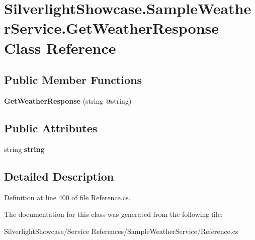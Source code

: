 \hypertarget{class_silverlight_showcase_1_1_sample_weather_service_1_1_get_weather_response}{
\section{SilverlightShowcase.SampleWeatherService.GetWeatherResponse Class Reference}
\label{class_silverlight_showcase_1_1_sample_weather_service_1_1_get_weather_response}
}
\subsection*{Public Member Functions}
\begin{DoxyCompactItemize}
\item 
\hypertarget{class_silverlight_showcase_1_1_sample_weather_service_1_1_get_weather_response_a25abdbd9059416888d635937b07f6cb9}{
{\bfseries GetWeatherResponse} (string @string)}
\label{class_silverlight_showcase_1_1_sample_weather_service_1_1_get_weather_response_a25abdbd9059416888d635937b07f6cb9}

\end{DoxyCompactItemize}
\subsection*{Public Attributes}
\begin{DoxyCompactItemize}
\item 
\hypertarget{class_silverlight_showcase_1_1_sample_weather_service_1_1_get_weather_response_a0f860c6dd5cb061f29461a332ee9c91e}{
string {\bfseries string}}
\label{class_silverlight_showcase_1_1_sample_weather_service_1_1_get_weather_response_a0f860c6dd5cb061f29461a332ee9c91e}

\end{DoxyCompactItemize}


\subsection{Detailed Description}


Definition at line 400 of file Reference.cs.

The documentation for this class was generated from the following file:\begin{DoxyCompactItemize}
\item 
SilverlightShowcase/Service References/SampleWeatherService/Reference.cs\end{DoxyCompactItemize}

